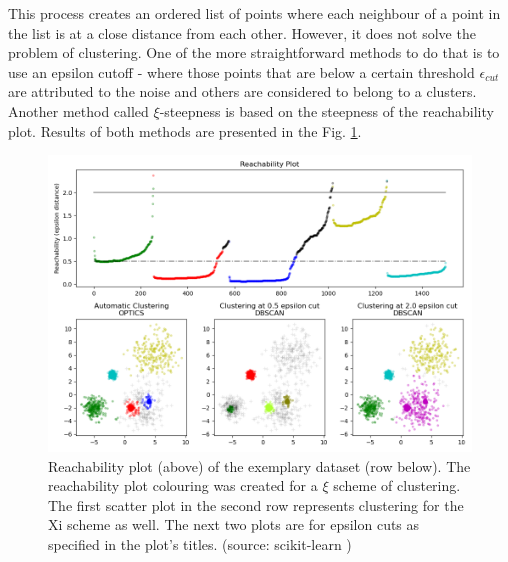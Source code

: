 This process creates an ordered list of points where each neighbour of a point in the list is at a close distance from each other.
However, it does not solve the problem of clustering.
One of the more straightforward methods to do that is to use an epsilon cutoff - where those points that are below a certain threshold $\epsilon_{cut}$ are attributed to the noise and others are considered to belong to a clusters.
Another method called $\xi$-steepness is based on the steepness of the reachability plot.
Results of both methods are presented in the Fig. \ref{fig:optics}.



\begin{figure}
  \centering
  \includegraphics[width=0.9\linewidth]{figures/chapter3/sphx_glr_plot_optics_001.png}
  \caption{Reachability plot (above) of the exemplary dataset (row below). The reachability plot colouring was created for a $\xi$ \cite{10.1145/304182.304187} scheme of clustering. The first scatter plot in the second  row represents clustering for the Xi scheme as well. The next two plots are for epsilon cuts as specified in the plot's titles. (source: scikit-learn \cite{scikit-learn})}
  \label{fig:optics}
\end{figure}


